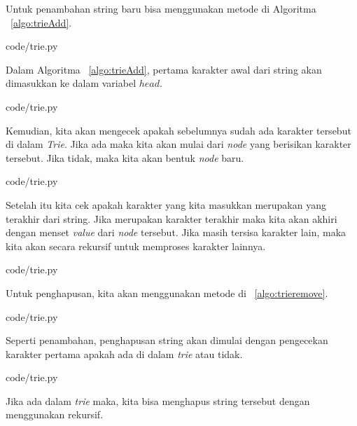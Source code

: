 Untuk penambahan string baru bisa menggunakan metode di Algoritma ~\ref{algo:trieAdd}. 


                {code/trie.py}

Dalam Algoritma ~\ref{algo:trieAdd}, pertama karakter awal dari string akan dimasukkan ke dalam variabel $head$. 


                {code/trie.py}
								
Kemudian, kita akan mengecek apakah sebelumnya sudah ada karakter tersebut di dalam \textit{Trie}. Jika ada maka kita akan mulai dari \textit{node} yang berisikan karakter tersebut. Jika tidak, maka kita akan bentuk \textit{node} baru.


                {code/trie.py}

Setelah itu kita cek apakah karakter yang kita masukkan merupakan yang terakhir dari string. Jika merupakan karakter terakhir maka kita akan akhiri dengan menset \textit{value} dari \textit{node} tersebut. Jika masih tersisa karakter lain, maka kita akan secara rekursif untuk memproses karakter lainnya.


                {code/trie.py}

Untuk penghapusan, kita akan menggunakan metode di ~\ref{algo:trieremove}. 


                {code/trie.py}
								
Seperti penambahan, penghapusan string akan dimulai dengan pengecekan karakter pertama apakah ada di dalam \textit{trie} atau tidak.


                {code/trie.py}

Jika ada dalam \textit{trie} maka, kita bisa menghapus string tersebut dengan menggunakan rekursif. 

